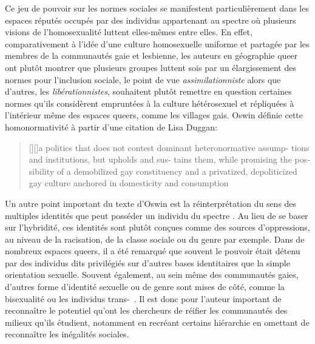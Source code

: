 Ce jeu de pouvoir sur les normes sociales se manifestent particulièrement dans les espaces réputés occupés par des individus appartenant au spectre \lgbt{} où plusieurs visions de l'homosexualité luttent elles-mêmes entre elles. 
En effet, comparativement à l'idée d'une culture homosexuelle uniforme et partagée par les membres de la communautés gaie et lesbienne, les auteurs en géographie queer ont plutôt montrer que plusieurs groupes luttent sois par un élargissement des normes pour l'inclusion sociale, le point de vue \emph{assimilationniste} alors que d'autres, les \emph{libérationnistes}, souhaitent plutôt remettre en question certaines normes qu'ils considèrent empruntées à la culture hétérosexuel et répliquées à l'intérieur même des espaces queers, comme les villages gais. 
Oswin définie cette homonormativité à partir d'une citation de Lisa Duggan: 
\foreignblockquote{english}[{\cite[tel que cité
  dans][92]{Oswin2008}}][]{[{\cite[50]{Duggan2003}}][]{a
    politics that does not contest dominant heteronormative assump- tions and
    institutions, but upholds and sus- tains them, while promising the
    possibility of a demobilized gay constituency and a privatized,
    depoliticized gay culture anchored in domesticity and consumption}}.

Un autre point important du texte d'Oswin est la réinterprétation du sens des multiples identités que peut posséder un individu du spectre \lgbt{}. 
Au lieu de se baser sur l'hybridité, ces identités sont plutôt conçues comme des sources d'oppressions, au niveau de la racisation, de la classe sociale ou du genre par exemple. 
Dans de nombreux espaces queers, il a été remarqué que souvent le pouvoir était détenu par des individus dits privilégiés sur d'autres bases identitaires que la simple orientation sexuelle. 
Souvent également, au sein même des communautés gaies, d'autres forme d'identité sexuelle ou de genre sont mises de côté, comme la bisexualité ou les individus trans-~\citep[93]{Oswin2008}.
Il est donc pour l'auteur important de reconnaître le potentiel qu'ont les chercheurs de réifier les communautés des milieux qu'ils étudient, notamment en recréant certains hiérarchie en omettant de reconnaître les inégalités sociales.

